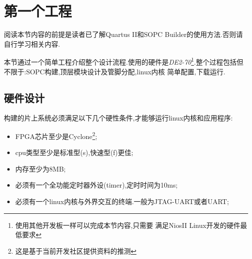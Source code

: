 \documentclass[12pt,a4paper,titlepage]{article}
\begin{document}
\section{第一个工程}
\setcounter{footnote}{0}
阅读本节内容的前提是读者已了解Quartus II和SOPC Builder的使用方法.否则请自行学习相关内容.

本节通过一个简单工程介绍整个设计流程.使用的硬件是\textit{DE2-70}\footnote{使用其他开发板一样可以完成本节内容,只需要
满足NiosII Linux开发的硬件最低要求}.整个过程包括但不限于:{SOPC构建,顶层模块设计及管脚分配,linux内核
简单配置,下载运行}.
\subsection{硬件设计}
构建的片上系统必须满足以下几个硬性条件,才能够运行linux内核和应用程序:
\begin{itemize}
\item FPGA芯片至少是Cyclone\footnote{这是基于当前开发社区提供资料的推测};
\item cpu类型至少是标准型(s),快速型(f)更佳;
\item 内存至少为8MB;
\item 必须有一个全功能定时器外设(timer),定时时间为10ms;
\item 必须有一个linux内核与外界交互的终端.一般为JTAG-UART或者UART;
\end{itemize}
\end{document}

